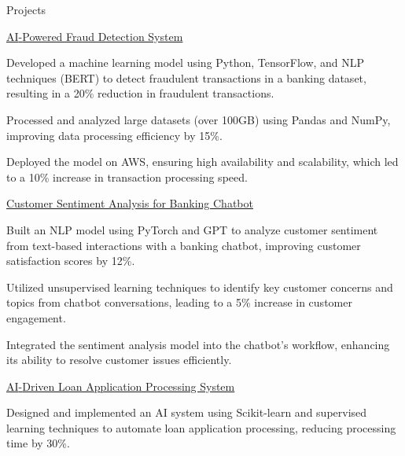 \documentclass{resume} %
\begin{document}
    \begin{rSection}{Projects}
                    \begin{rSubsection}
                                    {\href{https://github.com/example/fraud{-}detection}{AI{-}Powered Fraud Detection System}}
                                {}{}{}
                                    \item Developed a machine learning model using Python, TensorFlow, and NLP techniques (BERT) to detect fraudulent transactions in a banking dataset, resulting in a 20\% reduction in fraudulent transactions.
                                    \item Processed and analyzed large datasets (over 100GB) using Pandas and NumPy, improving data processing efficiency by 15\%.
                                    \item Deployed the model on AWS, ensuring high availability and scalability, which led to a 10\% increase in transaction processing speed.
                            \end{rSubsection}
                    \begin{rSubsection}
                                    {\href{https://github.com/example/chatbot{-}sentiment}{Customer Sentiment Analysis for Banking Chatbot}}
                                {}{}{}
                                    \item Built an NLP model using PyTorch and GPT to analyze customer sentiment from text{-}based interactions with a banking chatbot, improving customer satisfaction scores by 12\%.
                                    \item Utilized unsupervised learning techniques to identify key customer concerns and topics from chatbot conversations, leading to a 5\% increase in customer engagement.
                                    \item Integrated the sentiment analysis model into the chatbot's workflow, enhancing its ability to resolve customer issues efficiently.
                            \end{rSubsection}
                    \begin{rSubsection}
                                    {\href{https://github.com/example/loan{-}processing}{AI{-}Driven Loan Application Processing System}}
                                {}{}{}
                                    \item Designed and implemented an AI system using Scikit{-}learn and supervised learning techniques to automate loan application processing, reducing processing time by 30\%.

\end{rSubsection}
\end{rSection}
\end{document}

